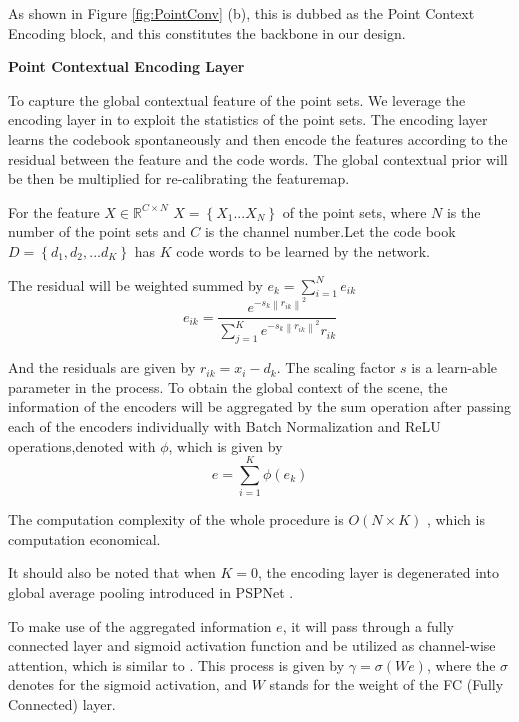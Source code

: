 \documentclass[runningheads]{llncs}
\begin{document}
As shown in Figure \ref{fig:PointConv} (b), this is dubbed as the Point Context Encoding block, and this constitutes the backbone in our design. 

\label{section:method}

\noindent \textbf{Point Contextual Encoding Layer}

To capture the global contextual feature of the point sets. We leverage the encoding layer in \cite{DeepTEN} to exploit the statistics of the point sets. The encoding layer learns the codebook spontaneously and then encode the features according to  the  residual between the feature and the code words. The global contextual prior will be then be multiplied for re-calibrating the featuremap.

For the feature $X \in \mathbb{R}^{ C \times N}$ $X=\left\{ X_{1} ... X_{N}\right\}$  of the point sets, where $N$ is the number of the point sets and $C$ is the channel number.Let 
the code book $D=\left\{d_{1},d_{2},...d_{K} \right\}$ has $K$ code words to be learned by the network.

The residual will be weighted summed by $e_{k}=\sum_{i=1}^{N} e_{ik}$
\begin{equation}
e_{ik} = \frac{e^{-s_{k}\left\| r_{ik}\right\|^{2}}}{\sum_{j=1}^{K} e^{-s_{k}\left\| r_{ik}\right\|^{2}} r_{ik}}
\label{encoding}
\end{equation}

And the residuals are given by $r_{ik}= x_{i}-d_{k}$. The scaling factor $s$ is a learn-able parameter in the process.
To obtain the global context of the scene, the information of the encoders will be aggregated by the sum operation after passing each  of the encoders individually with Batch Normalization \cite{BN} and ReLU operations,denoted with $\phi$,  which is given by
\begin{equation}
    e=\sum_{i=1}^{K} \phi (e_{k})
 \label{aggregation}  
\end{equation}

The computation complexity of the whole procedure is $O(N \times K)$ , which is computation economical.

It should also be noted that when $K=0$, the encoding layer is degenerated into global average pooling introduced in PSPNet \cite{PSPNet}.

To make use of the aggregated information $e$, it  will pass through a fully connected layer and sigmoid activation function and be utilized as  channel-wise attention, which is similar to \cite{SENet}.  This process is given by $\gamma=\sigma(We)$, where the $\sigma$ denotes for the sigmoid activation, and $W$ stands for the weight of the FC (Fully Connected) layer.
\end{document}

